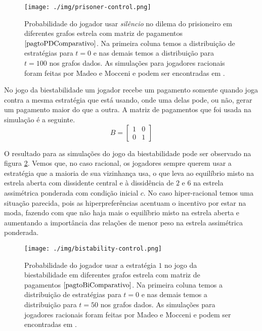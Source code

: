 \begin{figure}[h]
    \caption{Probabilidade do jogador usar \textit{silêncio} no dilema do prisioneiro em diferentes grafos estrela com matriz de pagamentos $\eqref{pagtoPDComparativo}$. Na primeira coluna temos a distribuição de estratégias para $t=0$ e nas demais temos a distribuição para $t=100$ nos grafos dados. As simulações para jogadores racionais foram feitas por Madeo e Mocceni e podem ser encontradas em \cite{madeo2015}.}
    \centerline{\texttt{[image: ./img/prisoner-control.png]}}
    \label{fig:prisoner-control.png}
\end{figure}

No jogo da biestabilidade um jogador recebe um pagamento somente quando joga contra a mesma estratégia que está usando, onde uma delas pode, ou não, gerar um pagamento maior do que a outra. A matriz de pagamentos que foi usada na simulação é a seguinte.
\begin{equation}
    \label{pagtoBiComparativo}
    B=
    \begin{bmatrix}
        1 & 0\\ 
        0 & 1 
    \end{bmatrix}
\end{equation}

O resultado para as simulações do jogo da biestabilidade pode ser observado na figura \ref{fig:bistability-control.png}. Vemos que, no caso racional, os jogadores sempre querem usar a estratégia que a maioria de sua vizinhança usa, o que leva ao equilíbrio misto na estrela aberta com dissidente central e à dissidência de $2$ e $6$ na estrela assimétrica ponderada com condição inicial $c$. No caso hiper-racional temos uma situação parecida, pois as hiperpreferências acentuam o incentivo por estar na moda, fazendo com que não haja mais o equilíbrio misto na estrela aberta e aumentando a importância das relações de menor peso na estrela assimétrica ponderada.

\begin{figure}[h]
    \caption{Probabilidade do jogador usar a estratégia $1$ no jogo da biestabilidade em diferentes grafos estrela com matriz de pagamentos $\eqref{pagtoBiComparativo}$. Na primeira coluna temos a distribuição de estratégias para $t=0$ e nas demais temos a distribuição para $t=50$ nos grafos dados. As simulações para jogadores racionais foram feitas por Madeo e Mocceni e podem ser encontradas em \cite{madeo2015}.}
    \centerline{\texttt{[image: ./img/bistability-control.png]}}
    \label{fig:bistability-control.png}
\end{figure}

